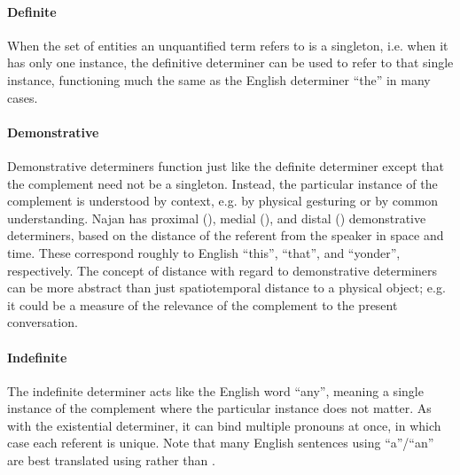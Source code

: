
\paragraph{Definite} When the set of entities an unquantified term refers to is
a singleton, i.e. when it has only one instance, the definitive determiner
 can be used to refer to that single instance, functioning much the
same as the English determiner ``the'' in many cases.



\paragraph{Demonstrative} Demonstrative determiners function just like the
definite determiner except that the complement need not be a singleton. Instead,
the particular instance of the complement is understood by context, e.g. by
physical gesturing or by common understanding. Najan has proximal
(), medial (), and distal () demonstrative
determiners, based on the distance of the referent from the speaker in space and
time. These correspond roughly to English ``this'', ``that'', and ``yonder'',
respectively. The concept of distance with regard to demonstrative determiners
can be more abstract than just spatiotemporal distance to a physical object;
e.g. it could be a measure of the relevance of the complement to the present
conversation.

\paragraph{Indefinite} The indefinite determiner  acts like the
English word ``any'', meaning a single instance of the complement where the
particular instance does not matter. As with the existential determiner, it can
bind multiple pronouns at once, in which case each referent is unique. Note that
many English sentences using ``a''/``an'' are best translated using 
rather than .

